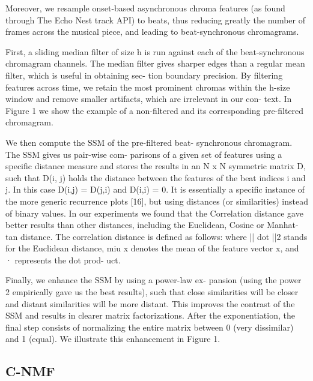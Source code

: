 Moreover, we resample onset-based asynchronous chroma features (as found through The Echo Nest track API) to beats, thus reducing greatly the number of frames across the musical piece, and leading to beat-synchronous chromagrams.

 First, a sliding median filter of size h is run against each of the beat-synchronous chromagram channels. The median filter gives sharper edges than a regular mean filter, which is useful in obtaining sec- tion boundary precision. By filtering features across time, we retain the most prominent chromas within the h-size window and remove smaller artifacts, which are irrelevant in our con- text. In Figure 1 we show the example of a non-filtered and its corresponding pre-filtered chromagram.

We then compute the SSM of the pre-filtered beat- synchronous chromagram. The SSM gives us pair-wise com- parisons of a given set of features using a specific distance measure and stores the results in an N x N symmetric matrix D, such that D(i, j) holds the distance between the features of the beat indices i and j. In this case D(i,j) = D(j,i) and D(i,i) = 0. It is essentially a specific instance of the more generic recurrence plots [16], but using distances (or similarities) instead of binary values. In our experiments we found that the Correlation distance gave better results than other distances, including the Euclidean, Cosine or Manhat- tan distance. The correlation distance is defined as follows:
where || dot ||2 stands for the Euclidean distance, miu x denotes the mean of the feature vector x, and · represents the dot prod- uct.

Finally, we enhance the SSM by using a power-law ex- pansion (using the power 2 empirically gave us the best results), such that close similarities will be closer and distant similarities will be more distant. This improves the contrast of the SSM and results in clearer matrix factorizations. After the exponentiation, the final step consists of normalizing the entire matrix between 0 (very dissimilar) and 1 (equal). We illustrate this enhancement in Figure 1.


\vspace{10pt}

\subsection{C-NMF}


\vspace{10pt}

